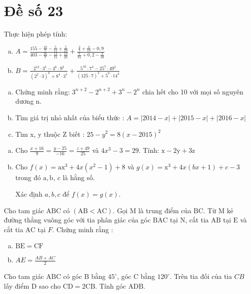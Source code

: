 \onehalfspacing
\section{Đề số 23}

\begin{bt} 
    Thực hiện phép tính:
   \begin{enumerate}[a.]
    \item $A=\frac{155-\frac{10}{7}-\frac{5}{11}+\frac{5}{23}}{403-\frac{26}{7}-\frac{13}{11}+\frac{13}{23}}+\frac{\frac{3}{5}+\frac{3}{13}-0,9}{\frac{7}{91}+0,2-\frac{3}{10}}$
    \item $B=\frac{2^{12} \cdot 3^5-4^6 \cdot 9^2}{\left(2^2 \cdot 3\right)^6+8^4 \cdot 3^5}+\frac{5^{10} \cdot 7^3-25^5 \cdot 49^2}{(125 \cdot 7)^3+5^9 \cdot 14^3}$
   \end{enumerate}
\loigiai{}
\end{bt}

\begin{bt}
    \hfill
	\begin{enumerate}[a.]
        \item Chứng minh rằng: $3^{n+2}-2^{n+2}+3^n-2^n$ chia hết cho 10 với mọi số nguyên dương $\mathrm{n}$.
        \item Tìm giá trị nhỏ nhất của biểu thức : $A=|2014-x|+|2015-x|+|2016-x|$
        \item Tìm x, y thuộc $\mathrm{Z}$ biết : $25-y^2=8(x-2015)^2$
    \end{enumerate}
	\loigiai{} 
\end{bt}

\begin{bt}
    \hfill
    \begin{enumerate}[a.]
        \item Cho $\frac{x+16}{9}=\frac{y-25}{-16}=\frac{z+49}{25}$ và $4 x^3-3=29$. Tính: $\mathrm{x}-2 \mathrm{y}+3 \mathrm{z}$
        \item Cho $f(x)=\mathrm{ax}^3+4 x\left(x^2-1\right)+8$ và $g(x)=\mathrm{x}^3+4 x(b x+1)+c-3$ trong đó $\mathrm{a}, \mathrm{b}$, $c$ là hằng số. 
        
        Xác định $a, b, c$ để $f(x)=g(x)$.
    \end{enumerate}
	\loigiai{}
\end{bt}

\begin{bt}
    Cho tam giác $\mathrm{ABC}$ có $(\mathrm{AB}<\mathrm{AC})$. Gọi $\mathrm{M}$ là trung điểm của $\mathrm{BC}$. Từ $\mathrm{M}$ kẻ đường thẳng vuông góc với tia phân giác của góc $\mathrm{BAC}$ tại $\mathrm{N}$, cắt tia $\mathrm{AB}$ tại $\mathrm{E}$ và cắt tia $\mathrm{AC}$ tại $F$. Chứng minh rằng :
    \begin{enumerate}[a.]
        \item $\mathrm{BE}=\mathrm{CF}$
        \item $A E=\frac{A B+A C}{2}$
    \end{enumerate}
\loigiai{}
\end{bt}

\begin{bt}
   Cho tam giác $\mathrm{ABC}$ có góc $\mathrm{B}$ bằng $45^{\circ}$, góc $\mathrm{C}$ bằng $120^{\circ}$. Trên tia đối của tia $CB$ lấy điểm $\mathrm{D}$ sao cho $\mathrm{CD}=2 \mathrm{CB}$. Tính góc $\mathrm{ADB}$.
\loigiai{}
\end{bt}

